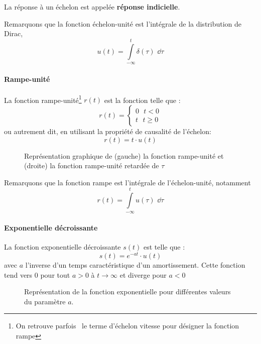La réponse à un échelon est appelée \textbf{réponse indicielle}.

Remarquons que la fonction échelon-unité est l'intégrale de la distribution de Dirac,
$$
u(t)=\int\limits_{-\infty}^{t} \delta(\tau)\,\,\dd{\tau}
$$

\paragraph{Rampe-unité}

La fonction rampe-unité\footnote{On retrouve parfois~\cite{sueurautomatique} le terme 
d'échelon vitesse pour désigner la fonction rampe} $r(t)$ est la fonction telle que :
$$
r(t)=
\begin{cases}
	0\,\,\,\,t<0 \\
	t\,\,\,\,t\geq0 
\end{cases}
$$
ou autrement dit, en utilisant la propriété de causalité de l'échelon:
$$
r(t)=t\cdot u(t)
$$

\begin{figure}[!h]
\begin{center}

\end{center}
    \caption{Représentation graphique de (gauche) la fonction rampe-unité et (droite) la fonction
        rampe-unité retardée de $\tau$\label{fig-rampe}}
\end{figure}
Remarquons que la fonction rampe est l'intégrale de l'échelon-unité, notamment 
$$
r(t)=\int\limits_{-\infty}^{t} u(\tau)\,\,\dd{\tau}
$$

\paragraph{Exponentielle décroissante}
La fonction exponentielle décroissante $s(t)$ est telle que :
$$
s(t)=e^{-at}\cdot u(t)
$$  
avec $a$ l'inverse d'un temps caractéristique d'un amortissement.
Cette fonction tend vers 0 pour tout $a>0$ à $t\rightarrow\infty$ et diverge pour $a<0$
\begin{figure}[!h]
\begin{center}

\end{center}
    \caption{Représentation de la fonction exponentielle pour différentes valeurs du paramètre $a$.\label{fig-exp}}
\end{figure}

